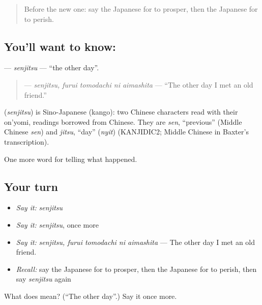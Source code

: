 \begin{quote}
Before the new one: say the Japanese for to prosper, then the Japanese for to perish.
\end{quote}

\subsection*{You'll want to know: }
\textbf{} — \emph{senjitsu} — \textquotedblleft{}the other day\textquotedblright{}.

\begin{quote}
\textbf{  } — \emph{senjitsu, furui tomodachi ni aimashita} — \textquotedblleft{}The other day I met an old friend.\textquotedblright{}
\end{quote}

\begin{cousinweb}
\textbf{} (\emph{senjitsu}) is Sino-Japanese (kango): two Chinese characters read with their on'yomi, readings borrowed from Chinese. They are \emph{sen}, \textquotedblleft{}previous\textquotedblright{} (Middle Chinese \emph{sen}) and \emph{jitsu}, \textquotedblleft{}day\textquotedblright{} (\emph{nyit}) (KANJIDIC2; Middle Chinese in Baxter's transcription).
\end{cousinweb}

\begin{grammarlens}[title={What you've built}]
One more word for telling what happened.
\end{grammarlens}

\subsection*{Your turn}
\begin{itemize}
\raggedright
  \item \emph{Say it:} \emph{senjitsu}
  \item \emph{Say it:} \emph{senjitsu}, once more
  \item \emph{Say it:} \emph{senjitsu, furui tomodachi ni aimashita} — The other day I met an old friend.
  \item \emph{Recall:} say the Japanese for to prosper, then the Japanese for to perish, then say \emph{senjitsu} again
\end{itemize}

\begin{tcolorbox}[breakable,colback=teal!4,colframe=teal!35!black,title={Before you move on}]
What does  mean? (\textquotedblleft{}The other day\textquotedblright{}.) Say it once more.
\end{tcolorbox}
